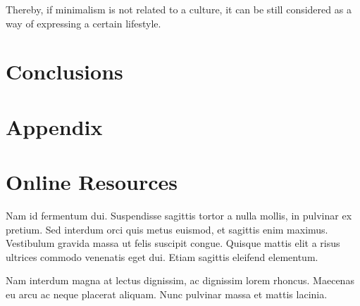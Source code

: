 \documentclass[sigconf]{acmart}
\begin{document}
Thereby, if minimalism is not related to a culture, it can be still considered as a way of expressing a certain lifestyle.

\section{Conclusions}

\section{Appendix}




\appendix


\section{Online Resources}

Nam id fermentum dui. Suspendisse sagittis tortor a nulla mollis, in
pulvinar ex pretium. Sed interdum orci quis metus euismod, et sagittis
enim maximus. Vestibulum gravida massa ut felis suscipit
congue. Quisque mattis elit a risus ultrices commodo venenatis eget
dui. Etiam sagittis eleifend elementum.

Nam interdum magna at lectus dignissim, ac dignissim lorem
rhoncus. Maecenas eu arcu ac neque placerat aliquam. Nunc pulvinar
massa et mattis lacinia.
\end{document}
